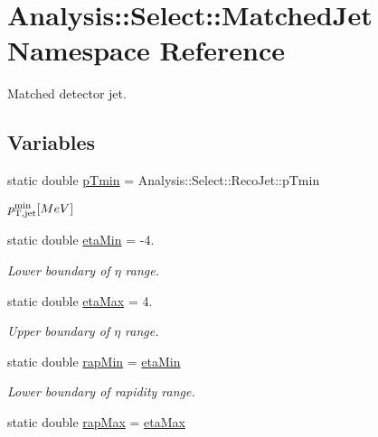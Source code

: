 \hypertarget{namespaceAnalysis_1_1Select_1_1MatchedJet}{}\section{Analysis\+:\+:Select\+:\+:Matched\+Jet Namespace Reference}
\label{namespaceAnalysis_1_1Select_1_1MatchedJet}


Matched detector jet.  


\subsection*{Variables}
\begin{DoxyCompactItemize}
\item 
static double \hyperlink{namespaceAnalysis_1_1Select_1_1MatchedJet_a70d769912979c438eb760d8a20cccbe0}{p\+Tmin} = Analysis\+::\+Select\+::\+Reco\+Jet\+::p\+Tmin
\begin{DoxyCompactList}\small\item\em $ p_{\rm T,jet}^{\rm min} [MeV] $ \end{DoxyCompactList}\item 
static double \hyperlink{namespaceAnalysis_1_1Select_1_1MatchedJet_a228bc6198c8f81574a0a079278850e20}{eta\+Min} = -\/4.
\begin{DoxyCompactList}\small\item\em Lower boundary of $ \eta $ range. \end{DoxyCompactList}\item 
static double \hyperlink{namespaceAnalysis_1_1Select_1_1MatchedJet_aace30370f95bae87ac3c44a942dc718d}{eta\+Max} = 4.
\begin{DoxyCompactList}\small\item\em Upper boundary of $ \eta $ range. \end{DoxyCompactList}\item 
static double \hyperlink{namespaceAnalysis_1_1Select_1_1MatchedJet_a4b14791609e4c5ca3c66c1811cbab05c}{rap\+Min} = \hyperlink{namespaceAnalysis_1_1Select_1_1MatchedJet_a228bc6198c8f81574a0a079278850e20}{eta\+Min}
\begin{DoxyCompactList}\small\item\em Lower boundary of rapidity range. \end{DoxyCompactList}\item 
static double \hyperlink{namespaceAnalysis_1_1Select_1_1MatchedJet_ac94f07d8da9fb774050861e765aa7f9e}{rap\+Max} = \hyperlink{namespaceAnalysis_1_1Select_1_1MatchedJet_aace30370f95bae87ac3c44a942dc718d}{eta\+Max}

\end{DoxyCompactItemize}
